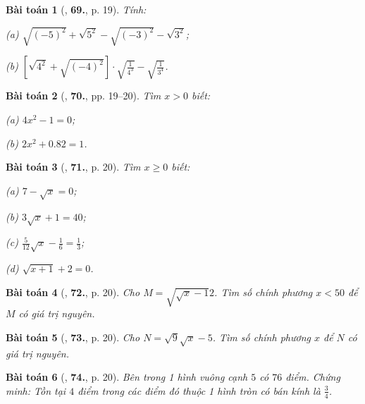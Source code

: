 \documentclass{article}
\numberwithin{equation}{section}
\newtheorem{baitoan}{Bài toán}
\begin{document}
\begin{baitoan}[\cite{Tuyen_Toan_7}, \textbf{69.}, p. 19]
	Tính:
	\begin{enumerate*}
		\item[(a)] $\sqrt{(-5)^2} + \sqrt{5^2} - \sqrt{(-3)^2} - \sqrt{3^2}$;
		\item[(b)] $\left[\sqrt{4^2} + \sqrt{(-4)^2}\right]\cdot\sqrt{\frac{1}{4^3}} - \sqrt{\frac{1}{3^4}}$.
	\end{enumerate*}
\end{baitoan}

\begin{baitoan}[\cite{Tuyen_Toan_7}, \textbf{70.}, pp. 19--20]
	Tìm $x > 0$ biết:
	\begin{enumerate*}
		\item[(a)] $4x^2 - 1 = 0$;
		\item[(b)] $2x^2 + 0.82 = 1$.
	\end{enumerate*}
\end{baitoan}

\begin{baitoan}[\cite{Tuyen_Toan_7}, \textbf{71.}, p. 20]
	Tìm $x\ge 0$ biết:
	\begin{enumerate*}
		\item[(a)] $7 - \sqrt{x} = 0$;
		\item[(b)] $3\sqrt{x} + 1 = 40$;
		\item[(c)] $\frac{5}{12}\sqrt{x} - \frac{1}{6} = \frac{1}{3}$;
		\item[(d)] $\sqrt{x + 1} + 2 = 0$.
	\end{enumerate*}
\end{baitoan}

\begin{baitoan}[\cite{Tuyen_Toan_7}, \textbf{72.}, p. 20]
	Cho $M = \sqrt{\sqrt{x} - 1}{2}$. Tìm số chính phương $x < 50$ để $M$ có giá trị nguyên.
\end{baitoan}

\begin{baitoan}[\cite{Tuyen_Toan_7}, \textbf{73.}, p. 20]
	Cho $N = \sqrt{9}{\sqrt{x} - 5}$. Tìm số chính phương $x$ để $N$ có giá trị nguyên.
\end{baitoan}

\begin{baitoan}[\cite{Tuyen_Toan_7}, \textbf{74.}, p. 20]
	Bên trong 1 hình vuông cạnh $5$ có $76$ điểm. Chứng minh: Tồn tại $4$ điểm trong các điểm đó thuộc 1 hình tròn có bán kính là $\frac{3}{4}$.
\end{baitoan}
\end{document}
